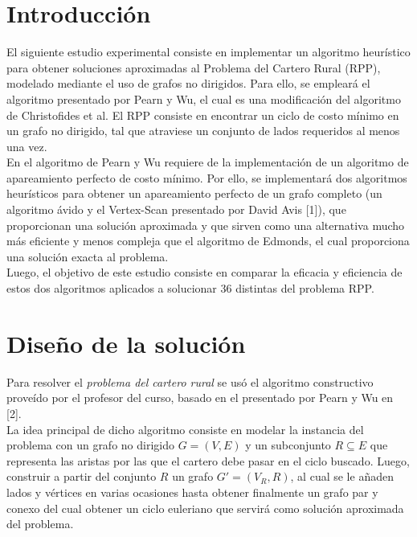 \documentclass[11pt]{article}
\begin{document}
                                                               
\newpage
                                                    
\section{Introducción}

El siguiente estudio experimental consiste en implementar un algoritmo heurístico para
obtener soluciones aproximadas al Problema del Cartero Rural (RPP), modelado mediante el uso 
de grafos no dirigidos. Para ello, se empleará el algoritmo presentado por Pearn y Wu, el
cual es una modificación del algoritmo de Christofides et al. El RPP consiste en encontrar 
un ciclo de costo mínimo en un grafo no dirigido, tal que atraviese un conjunto de lados 
requeridos al menos una vez. \\

En el algoritmo de Pearn y Wu requiere de la implementación de un algoritmo de apareamiento 
perfecto de costo mínimo. Por ello, se implementará dos algoritmos heurísticos para obtener 
un apareamiento perfecto de un grafo completo (un algoritmo ávido y el Vertex-Scan presentado
por David Avis [1]), que proporcionan una solución aproximada y que sirven como una alternativa
mucho más eficiente y menos compleja que el algoritmo de Edmonds, el cual proporciona una 
solución exacta al problema. \\

Luego, el objetivo de este estudio consiste en comparar la eficacia y eficiencia de estos
dos algoritmos aplicados a solucionar 36 distintas del problema RPP.

\section{Diseño de la solución}

Para resolver el \emph{problema del cartero rural} se usó el algoritmo constructivo
proveído por el profesor del curso, basado en el presentado por Pearn y Wu en [2]. \\

La idea principal de dicho algoritmo consiste en modelar la instancia del problema
con un grafo no dirigido $G = (V, E)$ y un subconjunto $R \subseteq E$ que representa
las aristas por las que el cartero debe pasar en el ciclo buscado. Luego, construir a
partir del conjunto $R$ un grafo $G' = (V_R, R)$, al cual se le añaden lados y vértices en varias
ocasiones hasta obtener finalmente un grafo par y conexo del cual obtener un ciclo
euleriano que servirá como solución aproximada del problema. \\
\end{document}
